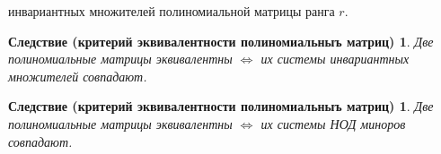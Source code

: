 инвариантных множителей полиномиальной матрицы ранга  $r$.
\newtheorem*{cor12_2_1}{Следствие (критерий эквивалентности полиномиальныъ матриц)}\begin{cor12_2_1}Две полиномиальные матрицы эквивалентны $\Longleftrightarrow$ их системы инвариантных множителей совпадают.
\end{cor12_2_1}
\newtheorem*{cor12_2_2}{Следствие (критерий эквивалентности полиномиальныъ матриц)}\begin{cor12_2_2}Две полиномиальные матрицы эквивалентны $\Longleftrightarrow$ их системы НОД миноров совпадают.
\end{cor12_2_2}











